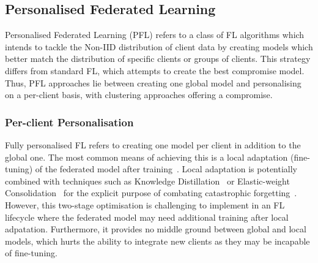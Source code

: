 \subsection{Personalised Federated Learning}

Personalised Federated Learning (PFL) refers to a class of FL algorithms which intends to tackle the Non-IID distribution of client data by creating models which better match the distribution of specific clients or groups of clients. This strategy differs from standard FL, which attempts to create the best compromise model. Thus, PFL approaches lie between creating one global model and personalising on a per-client basis, with clustering approaches offering a compromise.

\subsubsection{Per-client Personalisation}

Fully personalised FL refers to creating one model per client in addition to the global one. The most common means of achieving this is a local adaptation (fine-tuning) of the federated model after training~\citep{SalvagingFL,ThreeApproachesMansour,FinetuningIsFineFL}. Local adaptation is potentially combined with techniques such as Knowledge Distillation~\citep{DeepMutualLearning} or Elastic-weight Consolidation~\citep{EWC} for the explicit purpose of combating catastrophic forgetting~\citep{CatForgetting1}. However, this two-stage optimisation is challenging to implement in an FL lifecycle where the federated model may need additional training after local adpatation. Furthermore, it provides no middle ground between global and local models, which hurts the ability to integrate new clients as they may be incapable of fine-tuning.

